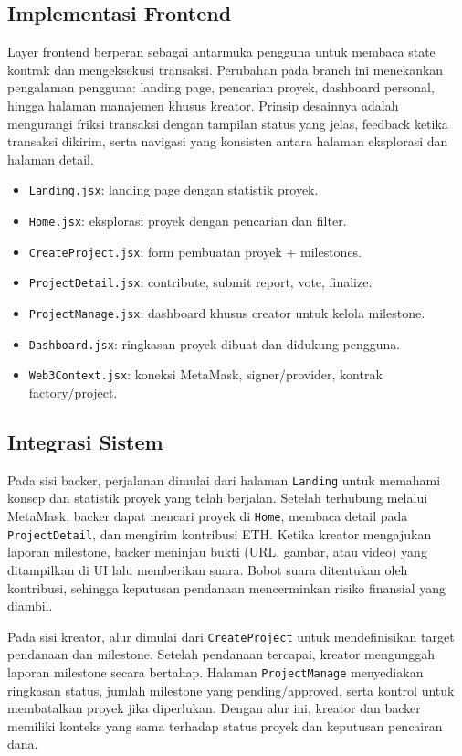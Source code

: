 \documentclass[12pt]{article}
\begin{document}
\subsection{Implementasi Frontend}
Layer frontend berperan sebagai antarmuka pengguna untuk membaca state kontrak dan mengeksekusi transaksi. Perubahan pada branch ini menekankan pengalaman pengguna: landing page, pencarian proyek, dashboard personal, hingga halaman manajemen khusus kreator. Prinsip desainnya adalah mengurangi friksi transaksi dengan tampilan status yang jelas, feedback ketika transaksi dikirim, serta navigasi yang konsisten antara halaman eksplorasi dan halaman detail.
\begin{itemize}[leftmargin=1.2em]
  \item \texttt{Landing.jsx}: landing page dengan statistik proyek.
  \item \texttt{Home.jsx}: eksplorasi proyek dengan pencarian dan filter.
  \item \texttt{CreateProject.jsx}: form pembuatan proyek + milestones.
  \item \texttt{ProjectDetail.jsx}: contribute, submit report, vote, finalize.
  \item \texttt{ProjectManage.jsx}: dashboard khusus creator untuk kelola milestone.
  \item \texttt{Dashboard.jsx}: ringkasan proyek dibuat dan didukung pengguna.
  \item \texttt{Web3Context.jsx}: koneksi MetaMask, signer/provider, kontrak factory/project.
\end{itemize}

\subsection{Integrasi Sistem}
Pada sisi backer, perjalanan dimulai dari halaman \texttt{Landing} untuk memahami konsep dan statistik proyek yang telah berjalan. Setelah terhubung melalui MetaMask, backer dapat mencari proyek di \texttt{Home}, membaca detail pada \texttt{ProjectDetail}, dan mengirim kontribusi ETH. Ketika kreator mengajukan laporan milestone, backer meninjau bukti (URL, gambar, atau video) yang ditampilkan di UI lalu memberikan suara. Bobot suara ditentukan oleh kontribusi, sehingga keputusan pendanaan mencerminkan risiko finansial yang diambil.

Pada sisi kreator, alur dimulai dari \texttt{CreateProject} untuk mendefinisikan target pendanaan dan milestone. Setelah pendanaan tercapai, kreator mengunggah laporan milestone secara bertahap. Halaman \texttt{ProjectManage} menyediakan ringkasan status, jumlah milestone yang pending/approved, serta kontrol untuk membatalkan proyek jika diperlukan. Dengan alur ini, kreator dan backer memiliki konteks yang sama terhadap status proyek dan keputusan pencairan dana.
\end{document}
